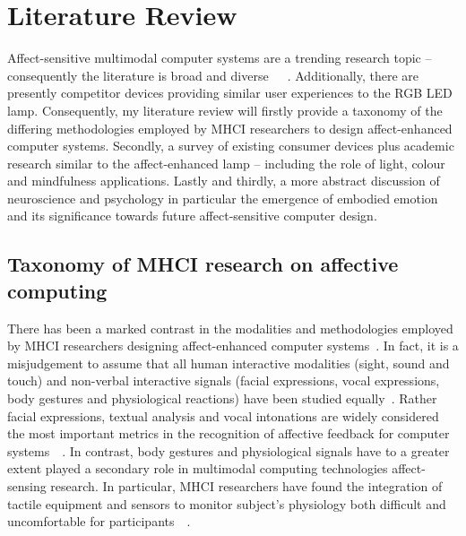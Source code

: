 \documentclass{sigchi}
\begin{document}
\section{Literature Review}

Affect-sensitive multimodal computer systems are a trending research topic – consequently the literature is broad and diverse~\cite{marechal2019survey}~\cite{pantic2003toward}~\cite{pantic2008human}. Additionally, there are presently competitor devices providing similar user experiences to the RGB LED lamp. Consequently, my literature review will firstly provide a taxonomy of the differing methodologies employed by MHCI researchers to design affect-enhanced computer systems. Secondly, a survey of existing consumer devices plus academic research similar to the affect-enhanced lamp – including the role of light, colour and mindfulness applications. Lastly and thirdly, a more abstract discussion of neuroscience and psychology in particular the emergence of embodied emotion and its significance towards future affect-sensitive computer design. 

\subsection{Taxonomy of MHCI research on affective computing}

There has been a marked contrast in the modalities and methodologies employed by MHCI researchers designing affect-enhanced computer systems~\cite{pantic2008human}. In fact, it is a misjudgement to assume that all human interactive modalities (sight, sound and touch) and non-verbal interactive signals (facial expressions, vocal expressions, body gestures and physiological reactions) have been studied equally~\cite{pantic2003toward}. Rather facial expressions, textual analysis and vocal intonations are widely considered the most important metrics in the recognition of affective feedback for computer systems~\cite{marechal2019survey}~\cite{pantic2008human}. In contrast, body gestures and physiological signals have to a greater extent played a secondary role in multimodal computing technologies affect-sensing research. In particular, MHCI researchers have found the integration of tactile equipment and sensors to monitor subject’s physiology both difficult and uncomfortable for participants~\cite{pantic2008human}~\cite{5771346}.
\end{document}
